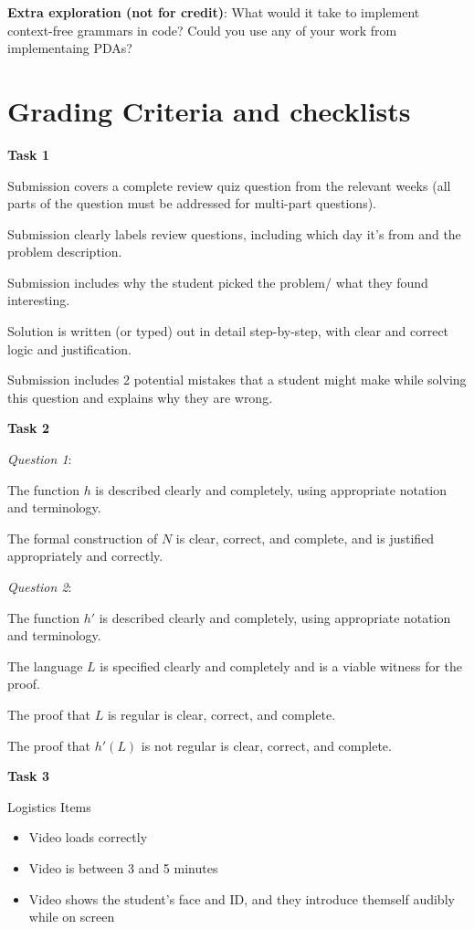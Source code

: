 \documentclass[12pt, oneside]{article}
\begin{document}
{\bf Extra exploration (not for credit)}: What would it take to implement context-free grammars in code? 
Could you use any of your work from implementaing PDAs?

	
\section{Grading Criteria and checklists}

{\bf Task 1}

Submission covers a complete review quiz question from the relevant weeks 
(all parts of the question must be addressed for multi-part questions).

Submission clearly labels review questions, including which day it's from and the problem description.

Submission includes why the student picked the problem/ what they found interesting.

Solution is written (or typed) out in detail step-by-step, with clear and correct logic and justification.

Submission includes 2 potential mistakes that a student might make while solving this question 
and explains why they are wrong.


{\bf Task 2}

{\it Question 1}: 

The function $h$ is described clearly and completely, using appropriate notation and terminology.

The formal construction of $N$ is clear, correct, and complete, and is justified appropriately
and correctly.

{\it Question 2}:

The function $h'$ is described clearly and completely, using appropriate notation and terminology.
    
The language $L$ is specified clearly and completely and is a viable witness 
for the proof.

The proof that $L$ is regular is clear, correct, and complete.

The proof that $h'(L)$ is not regular is clear, correct, and complete.

{\bf Task 3}

Logistics Items
\begin{itemize}
    \item Video loads correctly
    \item Video is between 3 and 5 minutes
    \item Video shows the student's face and ID, and they 
	introduce themself audibly while on screen
\end{itemize}
\end{document}
